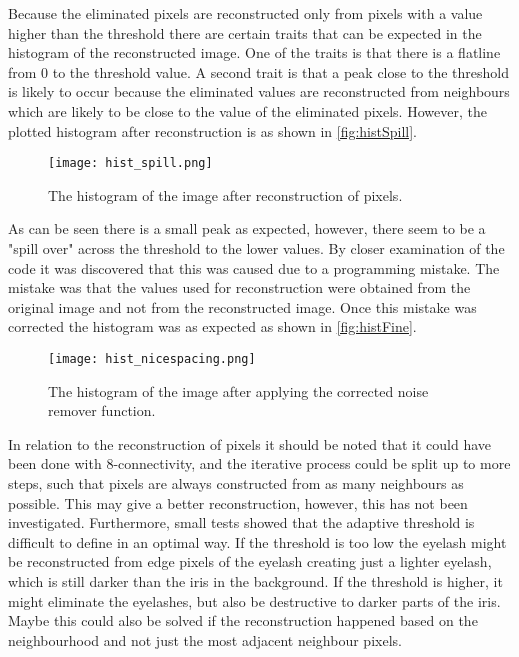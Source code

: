Because the eliminated pixels are reconstructed only from pixels with a value higher than the threshold there are certain traits that can be expected in the histogram of the reconstructed image. One of the traits is that there is a flatline from 0 to the threshold value. A second trait is that a peak close to the threshold is likely to occur because the eliminated values are reconstructed from neighbours which are likely to be close to the value of the eliminated pixels. However, the plotted histogram after reconstruction is as shown in \autoref{fig:histSpill}.
\begin{figure}[h]
\centering
\texttt{[image: hist\_spill.png]}
\caption{The histogram of the image after reconstruction of pixels.}
\label{fig:histSpill}
\end{figure}
As can be seen there is a small peak as expected, however, there seem to be a "spill over" across the threshold to the lower values. By closer examination of the code it was discovered that this was caused due to a programming mistake. The mistake was that the values used for reconstruction were obtained from the original image and not from the reconstructed image. Once this mistake was corrected the histogram was as expected as shown in \autoref{fig:histFine}. 
\begin{figure}[h]
\centering
\texttt{[image: hist\_nicespacing.png]}
\caption{The histogram of the image after applying the corrected noise remover function.}
\label{fig:histFine}
\end{figure}
In relation to the reconstruction of pixels it should be noted that it could have been done with 8-connectivity, and the iterative process could be split up to more steps, such that pixels are always constructed from as many neighbours as possible. This may give a better reconstruction, however, this has not been investigated. 
Furthermore, small tests showed that the adaptive threshold is difficult to define in an optimal way. If the threshold is too low the eyelash might be reconstructed from edge pixels of the eyelash creating just a lighter eyelash, which is still darker than the iris in the background. If the threshold is higher, it might eliminate the eyelashes, but also be destructive to darker parts of the iris. Maybe this could also be solved if the reconstruction happened based on the neighbourhood and not just the most adjacent neighbour pixels.
 

